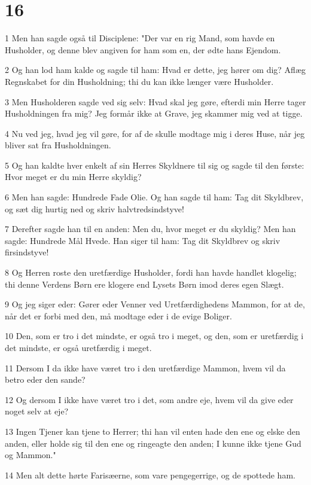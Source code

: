 \chapter{16}

\par 1 Men han sagde også til Disciplene: "Der var en rig Mand, som havde en Husholder, og denne blev angiven for ham som en, der ødte hans Ejendom.
\par 2 Og han lod ham kalde og sagde til ham: Hvad er dette, jeg hører om dig? Aflæg Regnskabet for din Husholdning; thi du kan ikke længer være Husholder.
\par 3 Men Husholderen sagde ved sig selv: Hvad skal jeg gøre, efterdi min Herre tager Husholdningen fra mig? Jeg formår ikke at Grave, jeg skammer mig ved at tigge.
\par 4 Nu ved jeg, hvad jeg vil gøre, for af de skulle modtage mig i deres Huse, når jeg bliver sat fra Husholdningen.
\par 5 Og han kaldte hver enkelt af sin Herres Skyldnere til sig og sagde til den første: Hvor meget er du min Herre skyldig?
\par 6 Men han sagde: Hundrede Fade Olie. Og han sagde til ham: Tag dit Skyldbrev, og sæt dig hurtig ned og skriv halvtredsindstyve!
\par 7 Derefter sagde han til en anden: Men du, hvor meget er du skyldig? Men han sagde: Hundrede Mål Hvede. Han siger til ham: Tag dit Skyldbrev og skriv firsindstyve!
\par 8 Og Herren roste den uretfærdige Husholder, fordi han havde handlet klogelig; thi denne Verdens Børn ere klogere end Lysets Børn imod deres egen Slægt.
\par 9 Og jeg siger eder: Gører eder Venner ved Uretfærdighedens Mammon, for at de, når det er forbi med den, må modtage eder i de evige Boliger.
\par 10 Den, som er tro i det mindste, er også tro i meget, og den, som er uretfærdig i det mindste, er også uretfærdig i meget.
\par 11 Dersom I da ikke have været tro i den uretfærdige Mammon, hvem vil da betro eder den sande?
\par 12 Og dersom I ikke have været tro i det, som andre eje, hvem vil da give eder noget selv at eje?
\par 13 Ingen Tjener kan tjene to Herrer; thi han vil enten hade den ene og elske den anden, eller holde sig til den ene og ringeagte den anden; I kunne ikke tjene Gud og Mammon."
\par 14 Men alt dette hørte Farisæerne, som vare pengegerrige, og de spottede ham.
